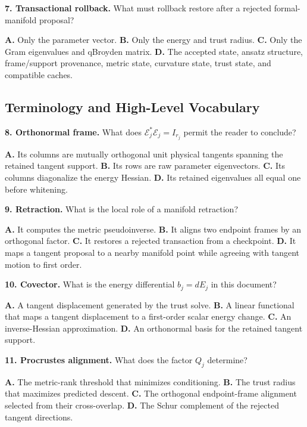 \documentclass[10pt,twocolumn]{article}
\begin{document}
\textbf{7. Transactional rollback.}
What must rollback restore after a rejected formal-manifold proposal?

\textbf{A.} Only the parameter vector.\quad
\textbf{B.} Only the energy and trust radius.\quad
\textbf{C.} Only the Gram eigenvalues and qBroyden matrix.\quad
\textbf{D.} The accepted state, ansatz structure, frame/support provenance,
metric state, curvature state, trust state, and compatible caches.

\subsection*{Terminology and High-Level Vocabulary}

\textbf{8. Orthonormal frame.}
What does \(\mathcal E_j^*\mathcal E_j=I_{r_j}\) permit the reader to conclude?

\textbf{A.} Its columns are mutually orthogonal unit physical tangents spanning
the retained tangent support.\quad
\textbf{B.} Its rows are raw parameter eigenvectors.\quad
\textbf{C.} Its columns diagonalize the energy Hessian.\quad
\textbf{D.} Its retained eigenvalues all equal one before whitening.

\textbf{9. Retraction.}
What is the local role of a manifold retraction?

\textbf{A.} It computes the metric pseudoinverse.\quad
\textbf{B.} It aligns two endpoint frames by an orthogonal factor.\quad
\textbf{C.} It restores a rejected transaction from a checkpoint.\quad
\textbf{D.} It maps a tangent proposal to a nearby manifold point while
agreeing with tangent motion to first order.

\textbf{10. Covector.}
What is the energy differential \(b_j=dE_j\) in this document?

\textbf{A.} A tangent displacement generated by the trust solve.\quad
\textbf{B.} A linear functional that maps a tangent displacement to a
first-order scalar energy change.\quad
\textbf{C.} An inverse-Hessian approximation.\quad
\textbf{D.} An orthonormal basis for the retained tangent support.

\textbf{11. Procrustes alignment.}
What does the factor \(Q_j\) determine?

\textbf{A.} The metric-rank threshold that minimizes conditioning.\quad
\textbf{B.} The trust radius that maximizes predicted descent.\quad
\textbf{C.} The orthogonal endpoint-frame alignment selected from their
cross-overlap.\quad
\textbf{D.} The Schur complement of the rejected tangent directions.
\end{document}
